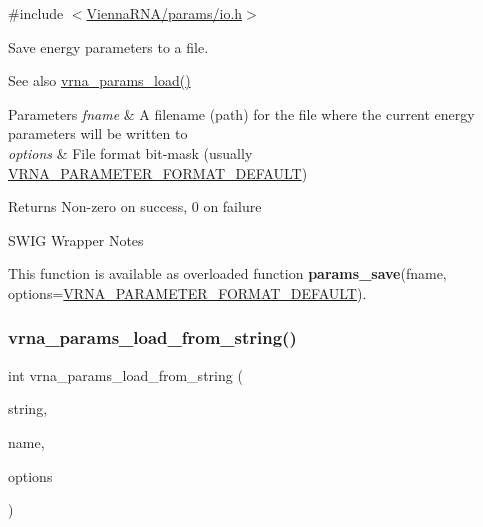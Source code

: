 {\ttfamily \#include $<$\mbox{\hyperlink{io_8h}{Vienna\+R\+N\+A/params/io.\+h}}$>$}



Save energy parameters to a file. 

\begin{DoxySeeAlso}{See also}
\mbox{\hyperlink{group__energy__parameters__rw_gabb0583595c67094986ef90cb4f1c7555}{vrna\+\_\+params\+\_\+load()}}
\end{DoxySeeAlso}

\begin{DoxyParams}{Parameters}
{\em fname} & A filename (path) for the file where the current energy parameters will be written to \\
\hline
{\em options} & File format bit-\/mask (usually \mbox{\hyperlink{group__energy__parameters__rw_ga2d46720ac5bf0e56ce0dbbff459667d2}{V\+R\+N\+A\+\_\+\+P\+A\+R\+A\+M\+E\+T\+E\+R\+\_\+\+F\+O\+R\+M\+A\+T\+\_\+\+D\+E\+F\+A\+U\+LT}}) \\
\hline
\end{DoxyParams}
\begin{DoxyReturn}{Returns}
Non-\/zero on success, 0 on failure
\end{DoxyReturn}
\begin{DoxyRefDesc}{S\+W\+I\+G Wrapper Notes}
\item[\mbox{\hyperlink{wrappers__wrappers000099}{S\+W\+I\+G Wrapper Notes}}]This function is available as overloaded function {\bfseries{params\+\_\+save}}(fname, options=\mbox{\hyperlink{group__energy__parameters__rw_ga2d46720ac5bf0e56ce0dbbff459667d2}{V\+R\+N\+A\+\_\+\+P\+A\+R\+A\+M\+E\+T\+E\+R\+\_\+\+F\+O\+R\+M\+A\+T\+\_\+\+D\+E\+F\+A\+U\+LT}}). \end{DoxyRefDesc}
\mbox{\label{group__energy__parameters__rw_gabcd9cc7040a6b633b56b1cbd6a14d68e}} 
\subsubsection{\texorpdfstring{vrna\_params\_load\_from\_string()}{vrna\_params\_load\_from\_string()}}
{\footnotesize\ttfamily int vrna\+\_\+params\+\_\+load\+\_\+from\+\_\+string (\begin{DoxyParamCaption}\item[{const char $\ast$}]{string,  }\item[{const char $\ast$}]{name,  }\item[{unsigned int}]{options }\end{DoxyParamCaption})}



